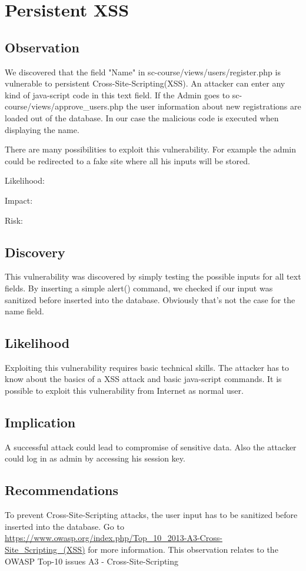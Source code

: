 \chapter{Persistent XSS}

\section{Observation}

We discovered that the field "Name" in sc-course/views/users/register.php is vulnerable to persistent Cross-Site-Scripting(XSS).
An attacker can enter any kind of java-script code in this text field. If the Admin goes to sc-course/views/approve\_users.php the user information about new registrations are  loaded out of the database. In our case the malicious code is executed when displaying the name.

There are many possibilities to exploit this vulnerability. For example the admin could be redirected to a fake site where all his inputs will be stored.\newline


Likelihood:  \newline

Impact: \newline

Risk: \newline

\section{Discovery}

This vulnerability was discovered by simply testing the possible inputs for all text fields. By inserting a simple alert() command, we checked if our input was sanitized before inserted into the database. Obviously that's not the case for the name field.

\section{Likelihood}
Exploiting this vulnerability requires basic technical skills. The attacker has to know about the basics of a XSS attack and basic java-script commands. It is possible to exploit this vulnerability from Internet as normal user.

\section{Implication}
A successful attack could lead to compromise of sensitive data. Also the attacker could log in as admin by accessing his session key.

\section{Recommendations}
To prevent Cross-Site-Scripting attacks, the user input has to be sanitized before inserted into the database. Go to \url{https://www.owasp.org/index.php/Top_10_2013-A3-Cross-Site_Scripting_(XSS)} for more information. \newline
This observation relates to the OWASP Top-10 issues A3 - Cross-Site-Scripting

